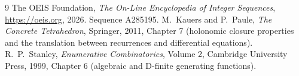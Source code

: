 \documentclass[11pt,a4paper]{article}
\theoremstyle{plain}
\theoremstyle{definition}
\begin{document}
\begin{thebibliography}{9}
 The OEIS Foundation, \emph{The On-Line Encyclopedia of Integer Sequences},
\url{https://oeis.org}, 2026. Sequence A285195.
 M.~Kauers and P.~Paule, \emph{The Concrete Tetrahedron}, Springer, 2011,
Chapter 7 (holonomic closure properties and the translation between recurrences and
differential equations).
 R.~P.~Stanley, \emph{Enumerative Combinatorics}, Volume 2, Cambridge
University Press, 1999, Chapter 6 (algebraic and D-finite generating functions).
\end{thebibliography}
\end{document}

